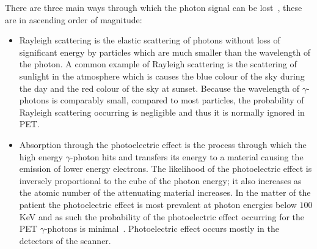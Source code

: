                 There are three main ways through which the photon signal can be lost~, these are in ascending order of magnitude:
                
                \begin{itemize}
                    
                    \item Rayleigh scattering is the elastic scattering of photons without loss of significant energy by particles which are much smaller than the wavelength of the photon. A common example of Rayleigh scattering is the scattering of sunlight in the atmosphere which is causes the blue colour of the sky during the day and the red colour of the sky at sunset. Because the wavelength of $\gamma$-photons is comparably small, compared to most particles, the probability of Rayleigh scattering occurring is negligible and thus it is normally ignored in \gls{PET}.
                    
                    \item Absorption through the photoelectric effect is the process through which the high energy $\gamma$-photon hits and transfers its energy to a material causing the emission of lower energy electrons. The likelihood of the photoelectric effect is inversely proportional to the cube of the photon energy; it also increases as the atomic number of the attenuating material increases. In the matter of the patient the photoelectric effect is most prevalent at photon energies below $100$ \gls{KeV} and as such the probability of the photoelectric effect occurring for the \gls{PET} $\gamma$-photons is minimal~. %
                    Photoelectric effect occurs mostly in the detectors of the scanner.
                    

\end{itemize}
